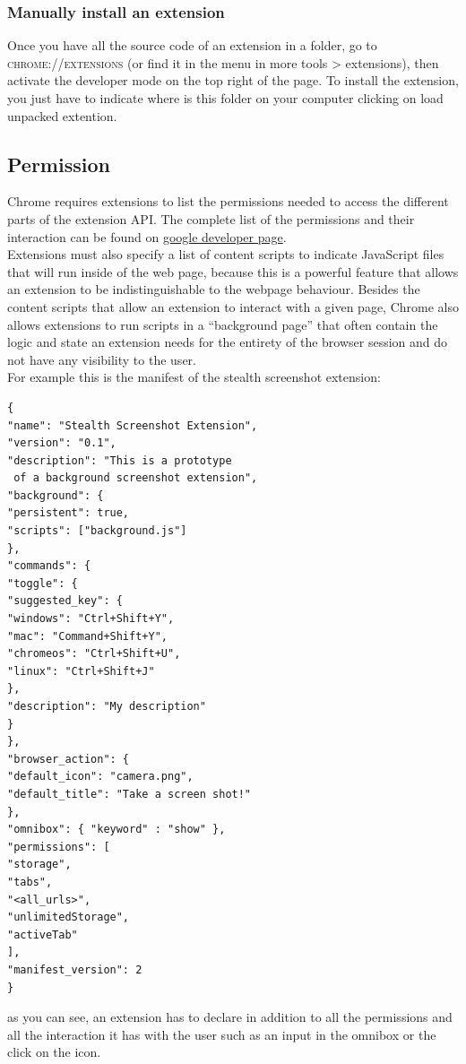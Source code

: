 \documentclass[12pt]{article}
\begin{document}
\begin{multicols}{2}
\subsubsection*{Manually install an extension}
	Once you have all the source code of an extension in a folder, go to  \textsc{chrome://extensions} (or find it in the menu in more tools > extensions), then activate the developer mode on the top right of the page. To install the extension, you just have to indicate where is this folder on your computer clicking on load unpacked extention.
\subsection*{Permission}
Chrome requires extensions to list the
permissions needed to access the different parts of the
extension API. The complete list of the permissions and their interaction can be found on \href{https://developer.chrome.com/extensions/declare_permissions}{google developer page}.\\
Extensions must also specify a list of content scripts to indicate
JavaScript files that will run inside of the web page, because this is a powerful feature that allows an extension to be indistinguishable to the webpage behaviour. Besides the content scripts that
allow an extension to interact with a given page,
Chrome also allows extensions to run scripts in a
“background page” that often contain the
logic and state an extension needs for the entirety
of the browser session and do not have any visibility
to the user.\\
For example this is the manifest of the stealth screenshot extension:
\begin{lstlisting}
{
"name": "Stealth Screenshot Extension",
"version": "0.1",
"description": "This is a prototype
 of a background screenshot extension",
"background": {
"persistent": true,
"scripts": ["background.js"]
},
"commands": {
"toggle": {
"suggested_key": {
"windows": "Ctrl+Shift+Y",
"mac": "Command+Shift+Y",
"chromeos": "Ctrl+Shift+U",
"linux": "Ctrl+Shift+J"
},
"description": "My description"
}
},
"browser_action": {
"default_icon": "camera.png",
"default_title": "Take a screen shot!"
},
"omnibox": { "keyword" : "show" },
"permissions": [
"storage",
"tabs",
"<all_urls>",
"unlimitedStorage",
"activeTab"
],
"manifest_version": 2
}
\end{lstlisting}
as you can see, an extension has to declare in addition to all the permissions and all the interaction it has with the user such as an input in the omnibox or the click on the icon.

\end{multicols}
\end{document}
